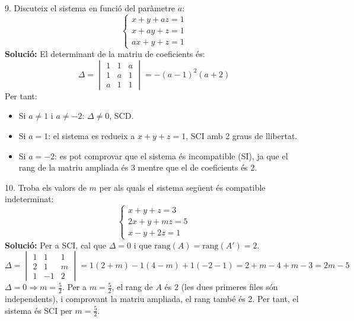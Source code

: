 \documentclass[12pt]{article}
\begin{document}
\begin{exercici}
9. Discuteix el sistema en funció del paràmetre \(a\):
\[
\begin{cases}
x + y + az = 1 \\
x + ay + z = 1 \\
ax + y + z = 1
\end{cases}
\]
\textbf{Solució:} El determinant de la matriu de coeficients és:
\[
\Delta = 
\begin{vmatrix}
1 & 1 & a \\
1 & a & 1 \\
a & 1 & 1
\end{vmatrix}
= - (a-1)^2 (a+2)
\]
Per tant:
\begin{itemize}
    \item Si \(a \neq 1\) i \(a \neq -2\): \(\Delta \neq 0\), SCD.
    \item Si \(a = 1\): el sistema es redueix a \(x+y+z=1\), SCI amb 2 graus de llibertat.
    \item Si \(a = -2\): es pot comprovar que el sistema és incompatible (SI), ja que el rang de la matriu ampliada és 3 mentre que el de coeficients és 2.
\end{itemize}
\end{exercici}

\begin{exercici}
10. Troba els valors de \(m\) per als quals el sistema següent és compatible indeterminat:
\[
\begin{cases}
x + y + z = 3 \\
2x + y + mz = 5 \\
x - y + 2z = 1
\end{cases}
\]
\textbf{Solució:} Per a SCI, cal que \(\Delta = 0\) i que \(\text{rang}(A) = \text{rang}(A') = 2\).
\[
\Delta = 
\begin{vmatrix}
1 & 1 & 1 \\
2 & 1 & m \\
1 & -1 & 2
\end{vmatrix}
= 1(2+m) - 1(4-m) + 1(-2-1) = 2+m-4+m-3 = 2m-5
\]
\(\Delta = 0 \Rightarrow m = \frac{5}{2}\). Per a \(m = \frac{5}{2}\), el rang de \(A\) és 2 (les dues primeres files són independents), i comprovant la matriu ampliada, el rang també és 2. Per tant, el sistema és SCI per \(m = \frac{5}{2}\).
\end{exercici}
\end{document}
